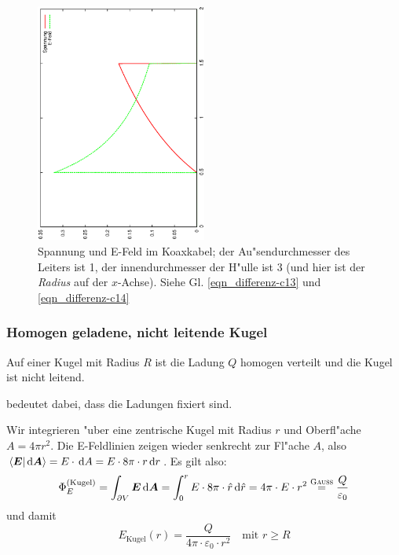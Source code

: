 \begin{figure}
   \centering
   \includegraphics[width=0.5\textwidth,angle=-90]{bilder/koax}
   \caption[Spannung und E-Feld im Koaxkabel]{Spannung und E-Feld im
     Koaxkabel; der Au"sendurchmesser des Leiters ist 1, der
     innendurchmesser der H"ulle ist 3 (und hier ist der \emph{Radius}
     auf der $x$-Achse). Siehe
     Gl. \eqref{eqn_differenz-c13} und \eqref{eqn_differenz-c14}}
   \label{abb_koax}
\end{figure}






\subsubsection{Homogen geladene, nicht leitende Kugel}
\label{kap_homogen-geladene-nicht-leitende-kugel}


Auf einer Kugel mit Radius $R$ ist die Ladung $Q$ homogen verteilt
und die Kugel ist nicht leitend.
\begin{Def}
    bedeutet dabei, dass die
   Ladungen fixiert sind.
\end{Def}

Wir integrieren "uber eine zentrische Kugel mit Radius $r$ und
Oberfl"ache $A = 4 \pi r^2$. Die E-Feldlinien zeigen wieder
senkrecht zur Fl"ache $A$, also $\langle \boldsymbol{E} | \, \mathrm{d} \boldsymbol{A}  \rangle
= E \cdot \, \mathrm{d} A = E \cdot 8 \pi \cdot r \, \mathrm{d} r$. Es gilt
also:
\begin{equation}
   \label{eqn_differenz-c16}
   \Phi_E^{(\text{Kugel})} = \int_{\partial V} \boldsymbol{E} \, \mathrm{d} \boldsymbol{A}
=
\int_{0}^r E \cdot 8 \pi \cdot \hat r \, \mathrm{d} \hat r
=
4 \pi  \cdot E \cdot r^2 \stackrel{\text{\textsc{Gauss}}}{=} \frac{Q}{\varepsilon_0}
\end{equation}
und damit
\begin{equation}
   \label{eqn_differenz-c03}
   \boxed{
E_\text{Kugel}(r) = \frac{Q}{4 \pi \cdot \varepsilon_0 \cdot r^2}
 }  ~ ~ ~  \text{ mit } r \geq R
\end{equation}

